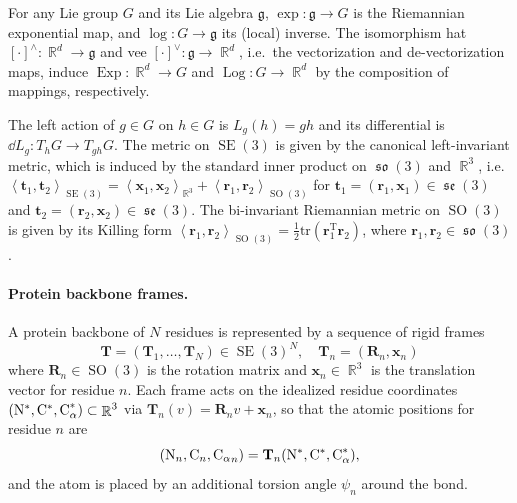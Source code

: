 \documentclass{article}
\theoremstyle{plain}
\theoremstyle{definition}
\theoremstyle{remark}
\DeclareMathOperator{\SE}{SE}
\DeclareMathOperator{\SO}{SO}
\DeclareMathOperator{\se}{\mathfrak{se}}
\DeclareMathOperator{\so}{\mathfrak{so}}
\DeclareMathOperator{\Exp}{\operatorname{Exp}}
\DeclareMathOperator{\Log}{\operatorname{Log}}
\DeclareMathOperator{\R}{\mathbb{R}}
\newcommand{\inner}[2]{\left\langle #1, #2\right\rangle}
\begin{document}
For any Lie group $G$ and its Lie algebra $\mathfrak{g}$, $\exp:\mathfrak{g}\to G$ is the Riemannian exponential map, and $\log:G\to\mathfrak{g}$ its (local) inverse. The isomorphism hat $[\cdot]^\wedge:\R^d \to\mathfrak{g}$ and vee $[\cdot]^\vee:\mathfrak{g}\to\R^d$, i.e.\ the vectorization and de-vectorization maps, induce $\Exp:\R^d\to G$ and $\Log:G\to\R^d$ by the composition of mappings, respectively.

The left action of $g\in G$ on $h\in G$ is $L_g(h)=gh$ and its differential is $\dd L_g: T_hG\to T_{gh}G$. The metric on $\SE(3)$ is given by the canonical left-invariant metric, which is induced by the standard inner product on $\so(3)$ and $\R^3$, i.e.\ $\inner{\mathbf{t}_1}{\mathbf{t}_2}_{\SE(3)}=\inner{\mathbf{x}_1}{\mathbf{x}_2}_{\R^3}+\inner{\mathbf{r}_1}{\mathbf{r}_2}_{\SO(3)}$ for $\mathbf{t}_1 =(\mathbf{r}_1,\mathbf{x}_1) \in \se(3)$ and $\mathbf{t}_2 =(\mathbf{r}_2,\mathbf{x}_2) \in \se(3)$. The bi-invariant Riemannian metric on $\SO(3)$ is given by its Killing form $\inner{\mathbf{r}_1}{\mathbf{r}_2}_{\SO(3)}=\frac{1}{2}\mathrm{tr}(\mathbf{r}_1^\mathrm{T}\mathbf{r}_2)$, where $\mathbf{r}_1,\mathbf{r}_2\in\so(3)$.

\paragraph{Protein backbone frames.}
A protein backbone of $N$ residues is represented by a sequence of rigid frames
\begin{equation*}
    \mathbf{T} = (\mathbf{T}_1,\dots,\mathbf{T}_N) \in \SE(3)^N,
    \quad \mathbf{T}_n=(\mathbf{R}_n,\mathbf{x}_n)
\end{equation*}
where $\mathbf{R}_n\in\SO(3)$ is the rotation matrix and $\mathbf{x}_n\in\R^3$ is the translation vector for residue $n$.
Each frame acts on the idealized residue coordinates $(\ce{N}^*,\ce{C}^*,\ce{C_\alpha}^*)\subset\R^3$ via
$\mathbf{T}_n(v)=\mathbf{R}_n v+\mathbf{x}_n$, so that the atomic positions for residue $n$ are
\begin{equation*}
    (\ce{N}_n,\ce{C}_n,{\ce{C_\alpha}}_n)=\mathbf{T}_n (\ce{N}^*,\ce{C}^*,\ce{C_\alpha}^*),
\end{equation*}
and the  atom is placed by an additional torsion angle $\psi_n$ around the  bond.
\end{document}
